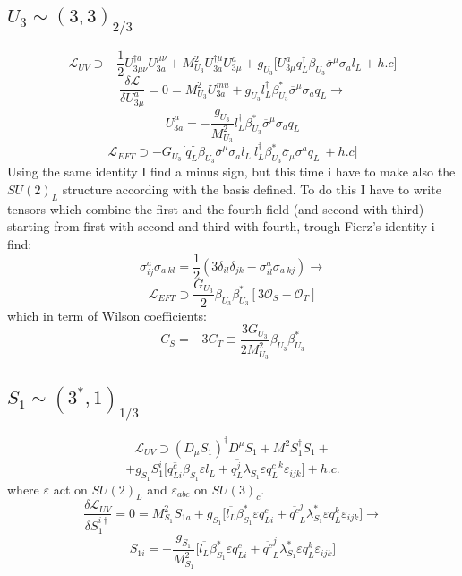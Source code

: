 \documentclass{article}
\begin{document}
\subsection{$U_3 \sim (3,3)_{2/3}$}
\[
\mathcal{L}_{UV} \supset -\frac{1}{2} U^{\dagger a}_{3\mu \nu} U_{3a}^{\mu \nu} + M^2_{U_3} U_{3a}^{\dagger\mu} U^a_{3 \mu} + g_{U_3}\big[ U_{3 \mu}^a q_L^\dagger \beta_{U_3} \overline{\sigma}^\mu \sigma_a l_L + h.c \big] 
\]
\[
\frac{\delta \mathcal{L}}{\delta U_{3 \mu}^a} =0 = M_{U_3}^2 U_{3a}^{mu} +g_{U_3} l_L^\dagger \beta^*_{U_3} \overline{\sigma}^\mu \sigma_a q_L \rightarrow
\]
\[
U^\mu_{3a} = -\frac{g_{U_3}}{M^2_{U_3}} l_L^\dagger \beta^*_{U_3} \overline{\sigma}^\mu \sigma_a q_L 
\]
\[
\mathcal{L}_{EFT} \supset -G_{U_3} \big[ q_L^\dagger \beta_{U_3} \overline{\sigma}^\mu \sigma_a l_L \ l_L^\dagger \beta^*_{U_3} \overline{\sigma}_\mu \sigma^a q_L \ + h.c \big]
\]
Using the same identity I find a minus sign, but this time i have to make also the $SU(2)_L$ structure according with the basis defined. To do this I have to write tensors which combine the first and the fourth field (and second with third) starting from first with second and third with fourth, trough Fierz's identity i find:
\[
\sigma^a_{ij} \sigma_{a \ kl} = \frac{1}{2} (3\delta_{il} \delta_{jk} - \sigma^a_{il} \sigma_{a \ kj}) \rightarrow
\]
\[
\mathcal{L}_{EFT} \supset \frac{G_{U_3}}{2} \beta_{U_3} \beta_{U_3}^*[3 \mathcal{O}_S - \mathcal{O}_T]
\]
which in term of Wilson coefficients:
\[
C_S = -3 C_T \equiv \frac{3 G_{U_3}}{2 M^2_{U_3}} \beta_{U_3} \beta_{U_3}^*
\]

\subsection{$S_1 \sim (3^*,1)_{1/3}$}
\[
\mathcal{L}_{UV} \supset (D_\mu S_1)^\dagger D^\mu S_1 + M^2 S_1^\dagger S_1 +
\]
\[
+g_{S_1} S_1^i \big[ \overline{q^c_{L i}} \beta_{S_1} \varepsilon l_L + \overline{q^j_L} \lambda_{S_1} \varepsilon {q^{c}_L}^k \varepsilon_{ijk} \big] +h.c.
\]
where $\varepsilon$ act on $SU(2)_L$ and $\varepsilon_{abc} $ on $SU(3)_c$.
\[
\frac{\delta \mathcal{L}_{UV}}{\delta S_1^{i \dagger}} =0= M^2_{S_1} S_{1a} + g_{S_1}\big[ \overline{l_L} \beta^*_{S_1} \varepsilon q^c_{L i} + \overline{q^c}_L^j \lambda_{S_1}^* \varepsilon q^k_L \varepsilon_{ijk}\big] \rightarrow
\]  
\[
S_{1i} = - \frac{g_{S_1}}{M^2_{S_1}} \big[ \overline{l_L} \beta^*_{S_1} \varepsilon q^c_{L i} + \overline{q^c}_L^j \lambda_{S_1}^* \varepsilon q^k_L \varepsilon_{ijk}\big] 
\]
\end{document}

